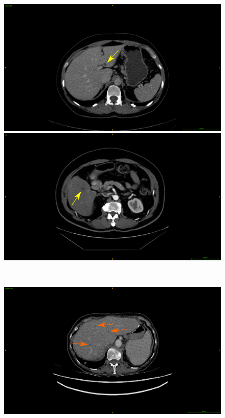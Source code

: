 {\begin{figure}[!ht]
	\begin{mdframed}[backgroundcolor=blue!50,linecolor=blue!50]
		\centering
		\begin{minipage}{0.45\linewidth}
			\includegraphics[width=\linewidth]{images/Artifacts/LITS_cyst}
		\end{minipage} \hspace{-0.1cm}
		\begin{minipage}{0.45\linewidth}
			\includegraphics[width=\linewidth]{images/Artifacts/TCIA_cyst}
		\end{minipage} \\
		\begin{minipage}{0.45\linewidth}
			\includegraphics[width=\linewidth]{images/Artifacts/LITS_fat}

\end{minipage}
\end{mdframed}
\end{figure}}
